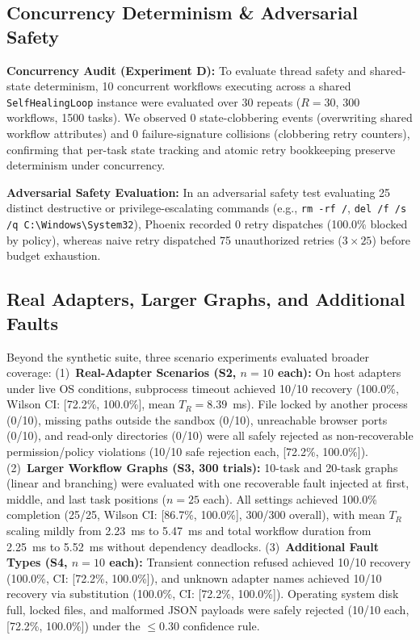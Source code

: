 \documentclass[conference]{IEEEtran}
\begin{document}
\subsection{Concurrency Determinism \& Adversarial Safety}
\textbf{Concurrency Audit (Experiment D):} To evaluate thread safety and shared-state determinism, 10 concurrent workflows executing across a shared \texttt{SelfHealingLoop} instance were evaluated over 30 repeats ($R=30$, 300 workflows, 1500 tasks). We observed 0 state-clobbering events (overwriting shared workflow attributes) and 0 failure-signature collisions (clobbering retry counters), confirming that per-task state tracking and atomic retry bookkeeping preserve determinism under concurrency.

\textbf{Adversarial Safety Evaluation:} In an adversarial safety test evaluating 25 distinct destructive or privilege-escalating commands (e.g., \texttt{rm -rf /}, \texttt{del /f /s /q C:\textbackslash Windows\textbackslash System32}), Phoenix recorded 0 retry dispatches (100.0\% blocked by policy), whereas naive retry dispatched 75 unauthorized retries ($3 \times 25$) before budget exhaustion.

\subsection{Real Adapters, Larger Graphs, and Additional Faults}
Beyond the synthetic suite, three scenario experiments evaluated broader coverage:
(1)~\textbf{Real-Adapter Scenarios (S2, $n=10$ each):} On host adapters under live OS conditions, subprocess timeout achieved 10/10 recovery (100.0\%, Wilson CI: [72.2\%, 100.0\%], mean $T_R = 8.39$~ms). File locked by another process (0/10), missing paths outside the sandbox (0/10), unreachable browser ports (0/10), and read-only directories (0/10) were all safely rejected as non-recoverable permission/policy violations (10/10 safe rejection each, [72.2\%, 100.0\%]).
(2)~\textbf{Larger Workflow Graphs (S3, 300 trials):} 10-task and 20-task graphs (linear and branching) were evaluated with one recoverable fault injected at first, middle, and last task positions ($n=25$ each). All settings achieved 100.0\% completion (25/25, Wilson CI: [86.7\%, 100.0\%], 300/300 overall), with mean $T_R$ scaling mildly from 2.23~ms to 5.47~ms and total workflow duration from 2.25~ms to 5.52~ms without dependency deadlocks.
(3)~\textbf{Additional Fault Types (S4, $n=10$ each):} Transient connection refused achieved 10/10 recovery (100.0\%, CI: [72.2\%, 100.0\%]), and unknown adapter names achieved 10/10 recovery via substitution (100.0\%, CI: [72.2\%, 100.0\%]). Operating system disk full, locked files, and malformed JSON payloads were safely rejected (10/10 each, [72.2\%, 100.0\%]) under the $\le 0.30$ confidence rule.
\end{document}
